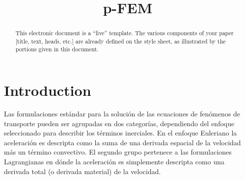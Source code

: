 \documentclass[a4paper,conference]{IEEEtran}
\begin{document}
\title{p-FEM }


\author{
\and
{}
\and
{}
}


\maketitle

\begin{abstract}
This electronic document is a ``live'' template. The various components of your paper [title, text, heads, etc.] are already defined on the style sheet, as illustrated by the portions given in this document.
\end{abstract}




\section{Introduction}

Las formulaciones estándar para la solución de las ecuaciones de fenómenos de transporte pueden ser agrupadas en dos categorías, dependiendo del enfoque seleccionado para describir los términos inerciales. En el enfoque Euleriano la aceleración es descripta como la suma de una derivada espacial de la velocidad más un término convectivo. El segundo grupo pertenece a las formulaciones Lagrangianas en dónde la aceleración es simplemente descripta como una derivada total (o derivada material) de la velocidad.
\end{document}

